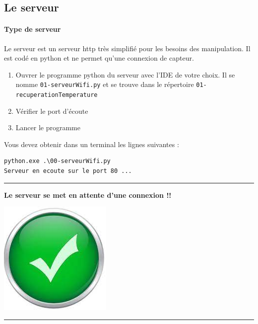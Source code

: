 \documentclass[french, 12pt]{article}%
\begin{document}
\subsection{Le serveur}

\paragraph{Type de serveur} Le serveur  est un serveur http très simplifié pour les besoins des manipulation. Il est codé en python et ne permet qu'une connexion de capteur.  

\begin{enumerate} [resume]
\item Ouvrer le programme python du serveur avec l'IDE de votre choix. Il se nomme \verb?01-serveurWifi.py? et se trouve dans le répertoire \verb?01-recuperationTemperature?
\item Vérifier le port d'écoute 
\item Lancer le programme 
\end{enumerate}

Vous devez obtenir dans un terminal les lignes suivantes : 
\begin{lstlisting}[style=commande]
python.exe .\00-serveurWifi.py
Serveur en ecoute sur le port 80 ...
\end{lstlisting}


\vspace{0.5cm}
\begin{center}
 \rule{0.75\linewidth}{1pt}
\end{center}
\begin{minipage}[c]{0.59\linewidth}

\textbf{Le serveur se met en attente d'une connexion !!}
\end{minipage}
\begin{minipage}[c]{0.4\linewidth}
\begin{center}
\includegraphics[scale=0.1]{./ressource/OKLogo}
\end{center}
\end{minipage}
\begin{center}
 \rule{0.75\linewidth}{1pt}
\end{center}
\end{document}

